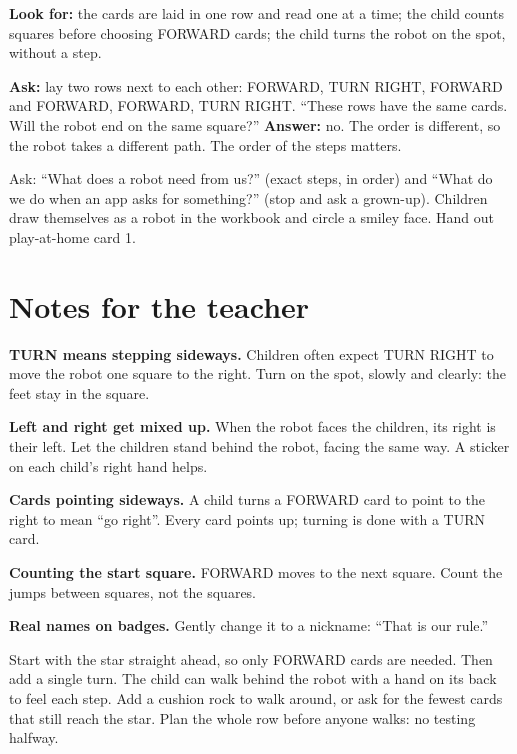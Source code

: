 \begin{formativecheck}
\textbf{Look for:} the cards are laid in one row and read one at a time; the child counts squares before choosing FORWARD cards; the child turns the robot on the spot, without a step.

\textbf{Ask:} lay two rows next to each other: FORWARD, TURN RIGHT, FORWARD and FORWARD, FORWARD, TURN RIGHT. \enquote{These rows have the same cards. Will the robot end on the same square?}
\textbf{Answer:} no. The order is different, so the robot takes a different path. The order of the steps matters.
\end{formativecheck}

\begin{reflection}
Ask: \enquote{What does a robot need from us?} (exact steps, in order) and \enquote{What do we do when an app asks for something?} (stop and ask a grown-up). Children draw themselves as a robot in the workbook and circle a smiley face. Hand out play-at-home card 1.
\end{reflection}

\section{Notes for the teacher}
\begin{commonmistakes}
  \item \textbf{TURN means stepping sideways.} Children often expect TURN RIGHT to move the robot one square to the right. Turn on the spot, slowly and clearly: the feet stay in the square.
  \item \textbf{Left and right get mixed up.} When the robot faces the children, its right is their left. Let the children stand behind the robot, facing the same way. A sticker on each child's right hand helps.
  \item \textbf{Cards pointing sideways.} A child turns a FORWARD card to point to the right to mean \enquote{go right}. Every card points up; turning is done with a TURN card.
  \item \textbf{Counting the start square.} FORWARD moves to the next square. Count the jumps between squares, not the squares.
  \item \textbf{Real names on badges.} Gently change it to a nickname: \enquote{That is our rule.}
\end{commonmistakes}

\begin{differentiation}
\supportpath Start with the star straight ahead, so only FORWARD cards are needed. Then add a single turn. The child can walk behind the robot with a hand on its back to feel each step.
\extensionpath Add a cushion rock to walk around, or ask for the fewest cards that still reach the star. Plan the whole row before anyone walks: no testing halfway.
\end{differentiation}


